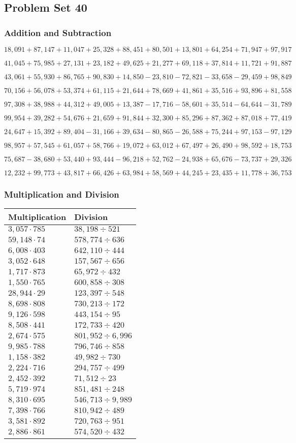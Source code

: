 \hypertarget{problem-set-40-4}{%
\subsection{Problem Set 40}\label{problem-set-40-4}}

\hypertarget{addition-and-subtraction-262}{%
\subsubsection{Addition and
Subtraction}\label{addition-and-subtraction-262}}

\(18,091+87,147+11,047+25,328+88,451+80,501+13,801+64,254+71,947+ 97,917\)

\(41,045+75,985+27,131+23,182+49,625+21,277+69,118+37,814+11,721+91,887\)

\(43,061+55,930+86,765+90,830+14,850-23,810-72,821-33,658-29,459+98,849\)

\(70,156+56,078+53,374+61,115+21,644+78,669+41,861+35,516+93,896+81,558\)

\(97,308+38,988+44,312+49,005+13,387-17,716-58,601+35,514-64,644-31,789\)

\(99,954+39,282+54,676+21,659+91,844+32,300+85,296+87,362+87,018+77,419\)

\(24,647+15,392+89,404-31,166+39,634-80,865-26,588+75,244+97,153-97,129\)

\(98,957+57,545+61,057+58,766+19,072+63,012+67,497+26,490+98,592+18,753\)

\(75,687-38,680+53,440+93,444-96,218+52,762-24,938+65,676-73,737+29,326\)

\(12,232+99,773+43,817+66,426+63,984+58,569+44,245+23,435+11,778+36,753\)

\hypertarget{multiplication-and-division-261}{%
\subsubsection{Multiplication and
Division}\label{multiplication-and-division-261}}

\begin{longtable}[]{@{}ll@{}}
\toprule
Multiplication & Division\tabularnewline
\midrule
\endhead
\(3,057\cdot785\) & \(38,198÷521\)\tabularnewline
\(59,148\cdot74\) & \(578,774÷636\)\tabularnewline
\(6,008\cdot403\) & \(642,110÷444\)\tabularnewline
\(3,052\cdot648\) & \(157,567÷656\)\tabularnewline
\(1,717\cdot873\) & \(65,972÷432\)\tabularnewline
\(1,550\cdot765\) & \(600,858÷308\)\tabularnewline
\(28,944\cdot29\) & \(123,397÷548\)\tabularnewline
\(8,698\cdot808\) & \(730,213÷172\)\tabularnewline
\(9,126\cdot598\) & \(443,154÷95\)\tabularnewline
\(8,508\cdot441\) & \(172,733÷420\)\tabularnewline
\(2,674\cdot575\) & \(801,952÷6,996\)\tabularnewline
\(9,985\cdot788\) & \(796,746÷858\)\tabularnewline
\(1,158\cdot382\) & \(49,982÷730\)\tabularnewline
\(2,224\cdot716\) & \(294,757÷499\)\tabularnewline
\(2,452\cdot392\) & \(71,512÷23\)\tabularnewline
\(5,719\cdot974\) & \(851,481÷248\)\tabularnewline
\(8,310\cdot695\) & \(546,713÷9,989\)\tabularnewline
\(7,398\cdot766\) & \(810,942÷489\)\tabularnewline
\(3,581\cdot892\) & \(720,763÷951\)\tabularnewline
\(2,886\cdot861\) & \(574,520÷432\)\tabularnewline
\bottomrule
\end{longtable}

